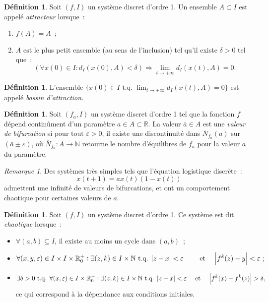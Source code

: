 \documentclass{article}
\theoremstyle{definition}
\newtheorem{déf}[thm]{Définition}
\theoremstyle{remark}
\newtheorem*{rmq}{Remarque}
\newcommand{\N}{\mathbb N}
\newcommand{\R}{\mathbb R}
\newcommand{\tq}{\text{ t.q. }}
\begin{document}
	\begin{déf} Soit $(f, I)$ un système discret d'ordre 1. Un ensemble $A \subset I$ est appelé \textit{attracteur} lorsque~:
	\begin{enumerate}
		\item $f(A) = A$~;
		\item $A$ est le plus petit ensemble (au sens de l'inclusion) tel qu'il existe $\delta > 0$ tel que~:
		\[\left(\forall x(0) \in I : d_I(x(0), A) < \delta\right) \Rightarrow \lim_{t \to +\infty} d_I(x(t), A) = 0.\]
	\end{enumerate}
	\end{déf}

	\begin{déf} L'ensemble $\{x(0) \in I \tq \lim_{t \to +\infty} d_I(x(t), A) = 0\}$ est appelé \textit{bassin d'attraction}.
	\end{déf}

	\begin{déf} Soit $(f_a, I)$ un système discret d'ordre 1 tel que la fonction $f$ dépend continûment d'un paramètre $a \in A \subset \R$.
	La valeur $\bar a \in A$ est une \textit{valeur de bifurcation} si pour tout $\varepsilon > 0$, il existe une discontinuité dans
	$\overline N_{f_a}(a)$ sur $(\bar a \pm \varepsilon)$, où $\overline N_{f_a} : A \to \N$ retourne le nombre d'équilibres de $f_a$ pour la valeur $a$
	du paramètre.
	\end{déf}

	\begin{rmq} Des systèmes très simples tels que l'équation logistique discrète~:
	\[x(t+1) = ax(t)(1 - x(t))\]
	admettent une infinité de valeurs de bifurcations, et ont un comportement chaotique pour certaines valeurs de $a$.
	\end{rmq}

	\begin{déf} Soit $(f, I)$ un système discret d'ordre 1. Ce système est dit \textit{chaotique} lorsque~:
	\begin{itemize}
		\item $\forall (a, b) \subseteq I$, il existe au moins un cycle dans $(a, b)$~;
		\item \[\forall (x, y, \varepsilon) \in I \times I \times \R_0^+ : \exists (z, k) \in I \times \N \tq
			\abs {z-x} < \varepsilon \qquad \text{ et } \quad \abs {f^k(z) - y} < \varepsilon~;\]
		\item \[\exists \delta > 0 \tq \forall (x, \varepsilon) \in I \times \R_0^+ :
			\exists (z, k) \in I \times \N \tq \abs {z-x} < \varepsilon \quad \text{ et } \quad \abs {f^k(x)-f^k(z)} > \delta,\]
		ce qui correspond à  la dépendance aux conditions initiales.
	\end{itemize}
	\end{déf}
\end{document}
